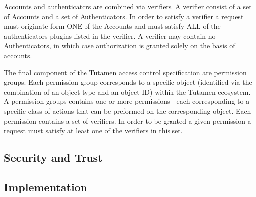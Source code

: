 Accounts and authenticators are combined via verifiers. A verifier
consist of a set of Accounts and a set of Authenticators. In order to
satisfy a verifier a request must originate form ONE of the Accounts
and must satisfy ALL of the authenticators plugins listed in the
verifier. A verifier may contain no Authenticators, in which case
authorization is granted solely on the basis of accounts.

The final component of the Tutamen access control specification are
permission groups. Each permission group corresponds to a specific
object (identified via the combination of an object type and an object
ID) within the Tutamen ecosystem. A permission groups contains one or
more permissions - each corresponding to a specific class of actions
that can be preformed on the corresponding object. Each permission
contains a set of verifiers. In order to be granted a given permission
a request must satisfy at least one of the verifiers in this set.

\subsection{Security and Trust}

\subsection{Implementation}

